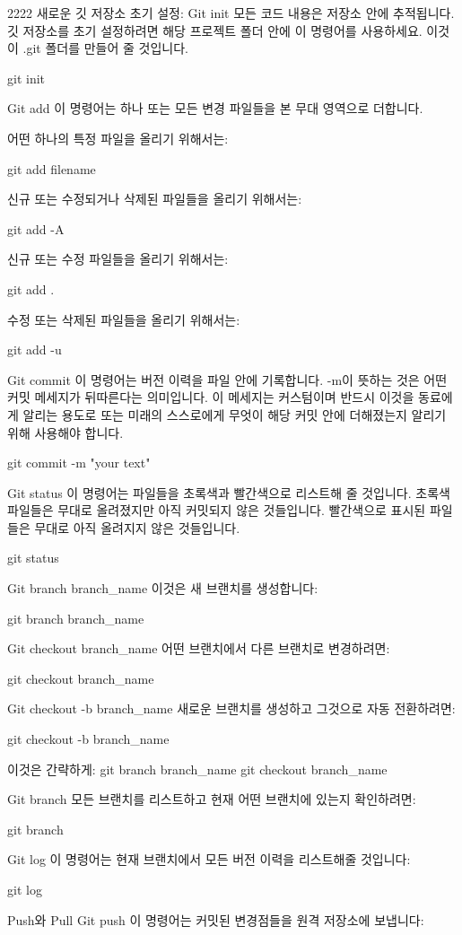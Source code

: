 2222
새로운 깃 저장소 초기 설정: Git init
모든 코드 내용은 저장소 안에 추적됩니다. 깃 저장소를 초기 설정하려면 해당 프로젝트 폴더 안에 이 명령어를 사용하세요. 이것이 .git 폴더를 만들어 줄 것입니다.

git init

Git add
이 명령어는 하나 또는 모든 변경 파일들을 본 무대 영역으로 더합니다.

어떤 하나의 특정 파일을 올리기 위해서는:

git add filename

신규 또는 수정되거나 삭제된 파일들을 올리기 위해서는:

git add -A

신규 또는 수정 파일들을 올리기 위해서는:

git add .

수정 또는 삭제된 파일들을 올리기 위해서는:

git add -u

Git commit
이 명령어는 버전 이력을 파일 안에 기록합니다. -m이 뜻하는 것은 어떤 커밋 메세지가 뒤따른다는 의미입니다. 이 메세지는 커스텀이며 반드시 이것을 동료에게 알리는 용도로 또는 미래의 스스로에게 무엇이 해당 커밋 안에 더해졌는지 알리기 위해 사용해야 합니다.

git commit -m "your text"

Git status
이 명령어는 파일들을 초록색과 빨간색으로 리스트해 줄 것입니다. 초록색 파일들은 무대로 올려졌지만 아직 커밋되지 않은 것들입니다. 빨간색으로 표시된 파일들은 무대로 아직 올려지지 않은 것들입니다.

git status

Git branch branch_name
이것은 새 브랜치를 생성합니다:

git branch branch_name

Git checkout branch_name
어떤 브랜치에서 다른 브랜치로 변경하려면:

git checkout branch_name

Git checkout -b branch_name
새로운 브랜치를 생성하고 그것으로 자동 전환하려면:

git checkout -b branch_name

이것은 간략하게:
git branch branch_name
git checkout branch_name


Git branch
모든 브랜치를 리스트하고 현재 어떤 브랜치에 있는지 확인하려면:

git branch

Git log
이 명령어는 현재 브랜치에서 모든 버전 이력을 리스트해줄 것입니다:

git log

Push와 Pull
Git push
이 명령어는 커밋된 변경점들을 원격 저장소에 보냅니다:

